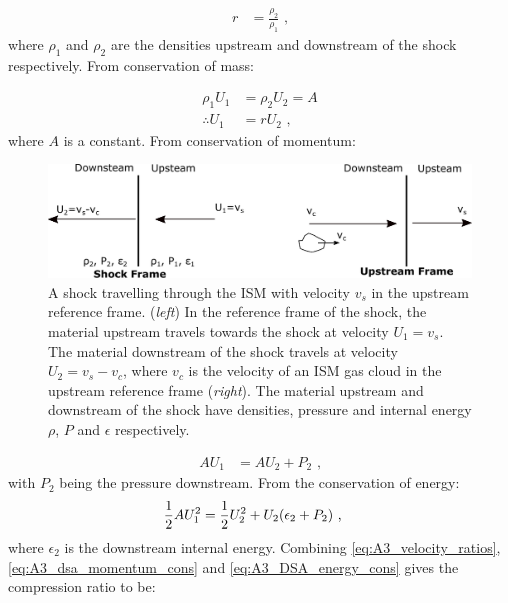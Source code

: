 \begin{equation}
    \begin{aligned}
        r&=\frac{\rho_2}{\rho_1}\text{ ,}
    \end{aligned}
\end{equation}
\noindent where $\rho_1$ and $\rho_2$ are the densities upstream and downstream of the shock respectively. From conservation of mass:

\begin{equation}
    \begin{aligned}
        \rho_1U_{1}&=\rho_2U_2=A \\
        \therefore U_{1}&=rU_{2}\text{ ,}
    \end{aligned} \label{eq:A3_velocity_ratios}
\end{equation}
\noindent where $A$ is a constant. From conservation of momentum:
\begin{figure}[!b]
	\centering
	\includegraphics[width=1.0\textwidth]{A3_Diffusive_Shock_Acceleration/Images/upstream_downstream.pdf}
	\caption{A shock travelling through the ISM with velocity $v_s$ in the upstream reference frame. (\textit{left}) In the reference frame of the shock, the material upstream travels towards the shock at velocity $U_1=v_s$. The material downstream of the shock travels at velocity $U_2=v_s-v_c$, where $v_c$ is the velocity of an ISM gas cloud in the upstream reference frame (\textit{right}). The material upstream and downstream of the shock have densities, pressure and internal energy $\rho$, $P$ and $\epsilon$ respectively.}
	\label{fig:A3_shock_dynamics2}
\end{figure}
\begin{subequations}
    \begin{alignat}{1}
        AU_{1}&=AU_{2}+P_2\text{ ,}
    \end{alignat} \label{eq:A3_dsa_momentum_cons}
\end{subequations}
\noindent with $P_2$ being the pressure downstream. From the conservation of energy:
\begin{equation}
    \begin{aligned}
        \frac{1}{2}AU_{1}^2&=\frac{1}{2}U_{2}^2+U_{2}\qty(\epsilon_2+P_2)\text{ ,}
    \end{aligned} \label{eq:A3_DSA_energy_cons}
\end{equation}
\noindent where $\epsilon_2$ is the downstream internal energy. Combining \autoref{eq:A3_velocity_ratios}, \autoref{eq:A3_dsa_momentum_cons} and \autoref{eq:A3_DSA_energy_cons} gives the compression ratio to be:

